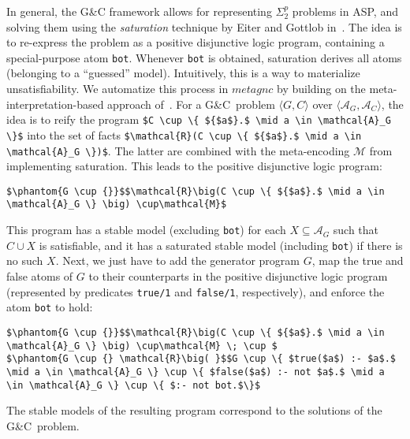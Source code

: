 \documentclass[a4paper,UKenglish]{oasics}
\newcommand{\lm}[1]{\lstinline[mathescape=true]!#1!}
\newcommand{\gc}[0]{G{\&}C}
\begin{document}
%
In general, the G{\&}C framework \cite{eitpol06a} 
allows for representing $\Sigma^p_2$ problems in ASP, 
and solving them using the \textit{saturation} technique by Eiter and Gottlob in~\cite{eitgot95a}.
%
The idea is to re-express the problem as a positive disjunctive logic program, containing a special-purpose atom \lm{bot}.
%
Whenever \lm{bot} is obtained, saturation derives all atoms (belonging to a ``guessed'' model).
%
Intuitively, this is a way to materialize unsatisfiability.
%
We automatize this process in $\mathit{metagnc}$ by building on the meta-interpretation-based approach of~\cite{gekasc11b}.
%
For a \gc\ problem $\langle G, C \rangle$ over $\langle \mathcal{A}_G,\mathcal{A}_C\rangle$,
the idea is to reify the program
\lstinline[mathescape=true]!$C \cup \{ ${$a$}.$ \mid a \in \mathcal{A}_G \}$!
into the set of facts
\lstinline[mathescape=true]!$\mathcal{R}(C \cup \{ ${$a$}.$ \mid a \in \mathcal{A}_G \})$!.
%
%
%
The latter are combined with the meta-encoding $\mathcal{M}$ from~\cite{gekasc11b} implementing saturation.
%
%
This leads to the positive disjunctive logic program:
\begin{lstlisting}[mathescape=true]
$\phantom{G \cup {}}$$\mathcal{R}\big(C \cup \{ ${$a$}.$ \mid a \in \mathcal{A}_G \} \big) \cup\mathcal{M}$
\end{lstlisting}
%
%
%
This program has a stable model (excluding \lm{bot}) for each $X \subseteq \mathcal{A}_G$ such that $C \cup X$ is satisfiable, 
and it has a saturated stable model (including \lm{bot}) if there is no such $X$.
%
%
%
%
%
%
%
%
%
%
%
%
%
%
%
%
Next, we just have to add the generator program $G$, 
map the true and false atoms of $G$ to their counterparts in the positive disjunctive logic program 
(represented by predicates \lm{true/1} and \lm{false/1}, respectively),
and enforce the atom \lm{bot} to hold:
\begin{lstlisting}[mathescape=true]
$\phantom{G \cup {}}$$\mathcal{R}\big(C \cup \{ ${$a$}.$ \mid a \in \mathcal{A}_G \} \big) \cup\mathcal{M} \; \cup $
$\phantom{G \cup {} \mathcal{R}\big( }$$G \cup \{ $true($a$) :- $a$.$ \mid a \in \mathcal{A}_G \} \cup \{ $false($a$) :- not $a$.$ \mid a \in \mathcal{A}_G \} \cup \{ $:- not bot.$\}$
\end{lstlisting}
%
%
%
%
%
%
%
The stable models of the resulting program correspond to the solutions of the \gc\ problem.
%
%
%
%
%
%
%
%
%
%
%
%
%
%
%

%
%
%
%
%
%
%
%

%
%
%
%
%
%


%
%
%
%
%
%
%
%
\end{document}
